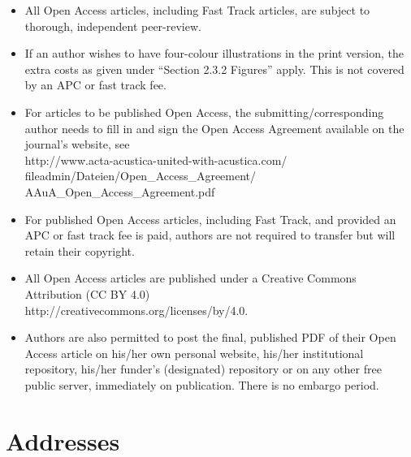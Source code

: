 \documentclass[twocolumn]{article}
\begin{document}
\begin{itemize}
\item  All Open Access articles, including Fast Track articles, are
   subject to thorough, independent peer-review.
\item  If an author wishes to have four-colour illustrations in the print
   version, the extra costs as given under ``Section 2.3.2 Figures''
   apply. This is not covered by an APC or fast track fee.
\item  For articles to be published Open Access, the
   sub\-mitting/corresponding author needs to fill in and sign the Open
   Access Agreement available on the journal's website, see\\
   http://www.acta-acustica-united-with-acustica.com/ \\
\hspace*{24pt}fileadmin/Dateien/Open\_Access\_Agreement/ \\
\hspace*{24pt}AAuA\_Open\_Access\_Agreement.pdf
\item  For published Open Access articles, including Fast Track, and
   provided an APC or fast track fee is paid, authors are not required
   to transfer but will retain their copyright.
\item  All Open Access articles are published under a Creative Commons
   Attribution (CC BY 4.0) \\ http://creativecommons.org/licenses/by/4.0.
\item  Authors are also permitted to post the final, published PDF of
   their Open Access article on his/her own personal website, his/her
   institutional repository, his/her funder's (designated) repository or
   on any other free public server, immediately on publication. There is
   no embargo period.
\end{itemize}


\section{Addresses}
\end{document}
